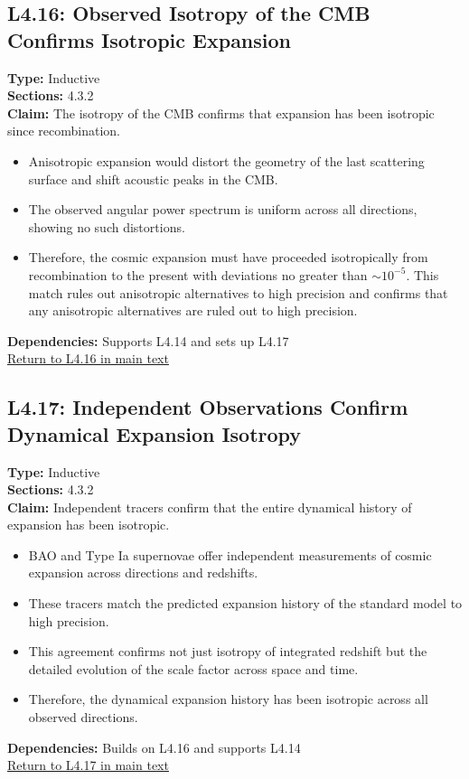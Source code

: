 \documentclass[12pt]{book}
\newcommand{\returnlink}[1]{\hyperref[logic:#1]{Return to #1 in main text}\xspace}
\begin{document}
\subsection*{L4.16: Observed Isotropy of the CMB Confirms Isotropic Expansion}
\label{appendix:L4.16}
\textbf{Type:} Inductive \\
\textbf{Sections:} 4.3.2 \\
\textbf{Claim:} The isotropy of the CMB confirms that expansion has been isotropic since recombination.
\begin{itemize}
  \item Anisotropic expansion would distort the geometry of the last scattering surface and shift acoustic peaks in the CMB.
  \item The observed angular power spectrum is uniform across all directions, showing no such distortions.
  \item Therefore, the cosmic expansion must have proceeded isotropically from recombination to the present with deviations no greater than $\sim10^{-5}$. This match rules out anisotropic alternatives to high precision and confirms that any anisotropic alternatives are ruled out to high precision.
\end{itemize}
\textbf{Dependencies:} Supports L4.14 and sets up L4.17 \\
\returnlink{L4.16}

\subsection*{L4.17: Independent Observations Confirm Dynamical Expansion Isotropy}
\label{appendix:L4.17}
\textbf{Type:} Inductive \\
\textbf{Sections:} 4.3.2 \\
\textbf{Claim:} Independent tracers confirm that the entire dynamical history of expansion has been isotropic.
\begin{itemize}
  \item BAO and Type Ia supernovae offer independent measurements of cosmic expansion across directions and redshifts.
  \item These tracers match the predicted expansion history of the standard model to high precision.
  \item This agreement confirms not just isotropy of integrated redshift but the detailed evolution of the scale factor across space and time.
  \item Therefore, the dynamical expansion history has been isotropic across all observed directions.
\end{itemize}
\textbf{Dependencies:} Builds on L4.16 and supports L4.14 \\
\returnlink{L4.17}
\end{document}
